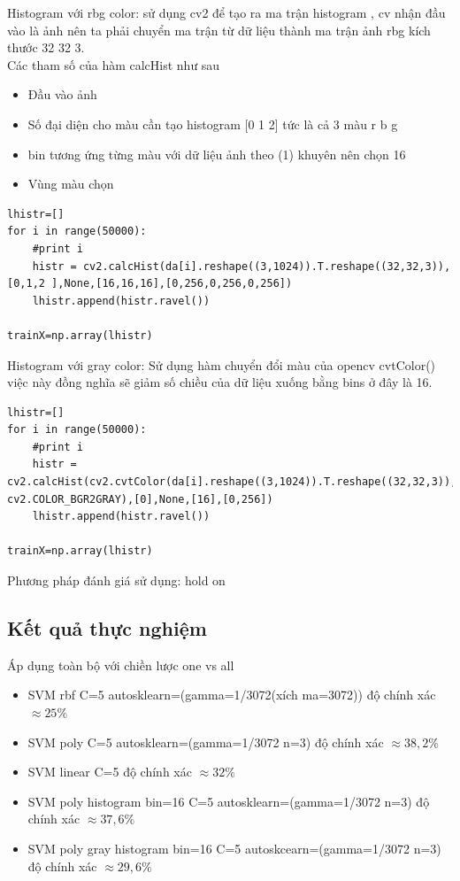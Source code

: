 \documentclass[a4paper,12pt]{report}
\begin{document}
Histogram với rbg color: sử dụng cv2 để tạo ra ma trận histogram , cv nhận đầu vào là ảnh nên ta phải chuyển ma trận từ dữ liệu thành ma trận ảnh rbg kích thước 32 32 3. \\
Các tham số của hàm  calcHist như sau 
\begin{itemize}
\item Đầu vào ảnh 
\item Số đại diện cho màu cần tạo histogram [0 1 2] tức là cả 3 màu r b g
\item bin tương ứng từng màu với dữ liệu ảnh theo (1) khuyên nên chọn 16 
\item Vùng màu chọn 
\end{itemize}
\begin{lstlisting}
lhistr=[]
for i in range(50000):
    #print i
    histr = cv2.calcHist(da[i].reshape((3,1024)).T.reshape((32,32,3)),[0,1,2 ],None,[16,16,16],[0,256,0,256,0,256])        
    lhistr.append(histr.ravel())

trainX=np.array(lhistr)
\end{lstlisting}
Histogram với gray color:
Sử dụng hàm chuyển đổi màu của opencv cvtColor() việc này đồng nghĩa sẽ giảm số chiều của dữ liệu xuống bằng bins ở đây là 16.
\begin{lstlisting}
lhistr=[]
for i in range(50000):
    #print i
    histr = cv2.calcHist(cv2.cvtColor(da[i].reshape((3,1024)).T.reshape((32,32,3)), cv2.COLOR_BGR2GRAY),[0],None,[16],[0,256])
    lhistr.append(histr.ravel())

trainX=np.array(lhistr)
\end{lstlisting}
Phương pháp đánh giá sử dụng: hold on
\subsection{Kết quả thực nghiệm}
Áp dụng toàn bộ với chiền lược one vs all
\begin{itemize}
\item SVM rbf C=5 autosklearn=(gamma=1/3072(xích ma=3072)) độ chính xác $\approx 25 \%$  
\item SVM poly C=5 autosklearn=(gamma=1/3072 n=3) độ chính xác $\approx 38,2 \%$
\item SVM linear C=5  độ chính xác $\approx 32 \%$    
\item SVM poly histogram bin=16 C=5 autosklearn=(gamma=1/3072 n=3) độ chính xác $\approx 37,6 \%$
\item SVM poly gray histogram bin=16 C=5 autoskcearn=(gamma=1/3072 n=3) độ chính xác $\approx 29,6 \%$
\end{itemize}
\end{document}
